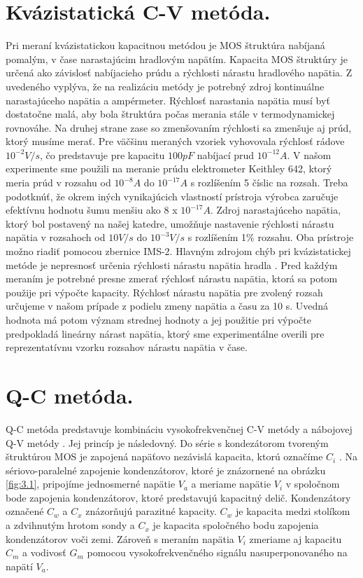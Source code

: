 \section{Kvázistatická C-V metóda.}\label{sec:3.2}

Pri meraní kvázistatickou kapacitnou metódou je MOS štruktúra nabíjaná
pomalým, v čase narastajúcim hradlovým napätím. Kapacita MOS štruktúry
je určená ako závislosť nabíjacieho prúdu a rýchlosti nárastu
hradlového napätia.  Z uvedeného vyplýva, že na realizáciu metódy je
potrebný zdroj kontinuálne narastajúceho napätia a
ampérmeter. Rýchlosť narastania napätia musí byť dostatočne malá, aby
bola štruktúra počas merania stále v termodynamickej rovnováhe. Na
druhej strane zase so zmenšovaním rýchlosti sa zmenšuje aj prúd, ktorý
musíme merať. Pre väčšinu meraných vzoriek vyhovovala rýchlosť rádove
$10^{-2} V/s$, čo predstavuje pre kapacitu $100 pF$ nabíjací prud
$10^{-12} A$. V našom experimente sme použili na meranie prúdu
elektrometer Keithley 642, ktorý meria prúd v rozsahu od $10^{-8} A$
do $10^{-17} A$ s rozlíšením 5 číslic na rozsah.  Treba podotknúť, že
okrem iných vynikajúcich vlastností prístroja výrobca zaručuje
efektívnu hodnotu šumu menšiu ako $8$ x $10^{-17} A$. Zdroj narastajúceho
napätia, ktorý bol postavený na našej katedre, umožňuje nastavenie
rýchlosti nárastu napätia v rozsahoch od $10 V/s$ do $10^{-3} V/s$ s
rozlíšením 1\% rozsahu. Oba prístroje možno riadiť pomocou zbernice
IMS-2.  Hlavným zdrojom chýb pri kvázistatickej metóde je nepresnosť
určenia rýchlosti nárastu napätia hradla \cite{1.5}. Pred každým
meraním je potrebné presne zmerať rýchlosť nárastu napätia, ktorá sa
potom použije pri výpočte kapacity. Rýchlosť nárastu napätia pre
zvolený rozsah určujeme v našom prípade z podielu zmeny napätia a času
za 10 s.  Uvedná hodnota má potom význam strednej hodnoty a jej
použitie pri výpočte predpokladá lineárny nárast napätia, ktorý sme
experimentálne overili pre reprezentatívnu vzorku rozsahov nárastu
napätia v čase.

\section{Q-C metóda.}\label{sec:3.3}

Q-C metóda \cite{3.4} predstavuje kombináciu vysokofrekvenčnej C-V
metódy a nábojovej Q-V metódy \cite{3.5}. Jej princíp je
následovný. Do série s kondezátorom tvoreným štruktúrou MOS je
zapojená napäťovo nezávislá kapacita, ktorú označíme $C_i$ .  Na
sériovo-paralelné zapojenie kondenzátorov, ktoré je znázornené na obrázku \ref{fig:3.1}, pripojíme jednosmerné napätie $V_a$ a meriame napätie
$V_i$ v spoločnom bode zapojenia kondenzátorov, ktoré predstavujú
kapacitný delič. Kondenzátory označené $C_w$ a $C_x$ znázorňujú
parazitné kapacity. $C_w$ je kapacita medzi stolíkom a zdvihnutým
hrotom sondy a $C_x$ je kapacita spoločného bodu zapojenia
kondenzátorov voči zemi. Zároveň s meraním napätia $V_i$ zmeriame aj
kapacitu $C_m$ a vodivosť $G_m$ pomocou vysokofrekvenčného signálu
nasuperponovaného na napätí $V_a$.

